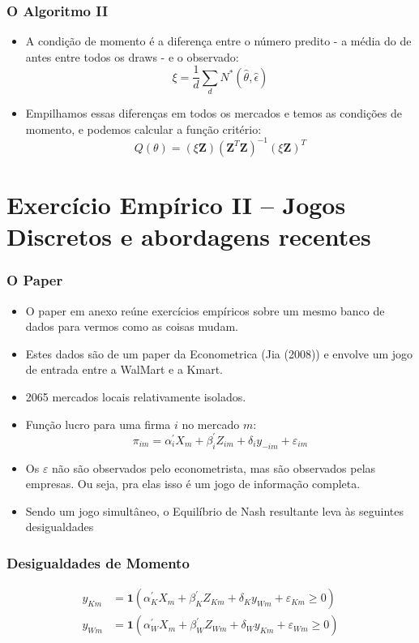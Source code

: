 \documentclass{beamer}
\begin{document}
\begin{frame}[fragile]\frametitle{O Algoritmo II}
    
    \begin{itemize}
        \item A condição de momento é a diferença entre o número predito - a média do de antes entre todos os draws - e o observado:
        \[
        \xi=\frac{1}{d} \sum_{d} N^{*} (\hat{\theta},\hat{\epsilon})
        \]
        \item Empilhamos essas diferenças em todos os mercados e temos as condições de momento, e podemos calcular a função critério:
        \[
        Q(\theta)=(\xi \mathbf{Z})(\mathbf{Z}^T \mathbf{Z})^{-1} (\xi \mathbf{Z})^{T}
        \]
    \end{itemize}


\end{frame}

\section{Exercício Empírico II -- Jogos Discretos e abordagens recentes}

\begin{frame}[fragile]\frametitle{O Paper}
    
    \begin{itemize}
        \item O paper em anexo reúne exercícios empíricos sobre um mesmo banco de dados para vermos como as coisas mudam.
        \item Estes dados são de um paper da Econometrica (Jia (2008)) e envolve um jogo de entrada entre a WalMart e a Kmart.
        \item 2065 mercados locais relativamente isolados.
        \item Função lucro para uma firma $i$ no mercado $m$:
        \[
        \pi_{im}=\alpha_{i}^{\prime} X_{m} + \beta_{i}^{\prime} Z_{im} + \delta_{i} y_{-im} + \varepsilon_{im}
        \]
        \item Os $\varepsilon$ não são observados pelo econometrista, mas são observados pelas empresas. Ou seja, pra elas isso é um jogo de informação completa.
        \item Sendo um jogo simultâneo, o Equilíbrio de Nash resultante leva às seguintes desigualdades
    \end{itemize}


\end{frame}


\begin{frame}[fragile]\frametitle{Desigualdades de Momento}

\begin{align*}
    y_{Km}&=\mathbf{1}(\alpha_{K}^{\prime} X_{m} + \beta_{K}^{\prime} Z_{Km} + \delta_{K} y_{Wm} + \varepsilon_{Km} \geq 0) \\
    y_{Wm}&=\mathbf{1}(\alpha_{W}^{\prime} X_{m} + \beta_{W}^{\prime} Z_{Wm} + \delta_{W} y_{Km} + \varepsilon_{Wm} \geq 0) \\
\end{align*}



\end{frame}
\end{document}
